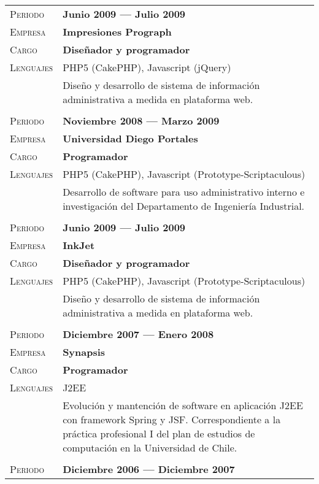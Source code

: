 \documentclass[letterpaper, oneside, final, 12pt]{scrartcl}
\newcommand{\gray}{\rowcolor[gray]{.90}}
\begin{document}
\begin{center}
\begin{tabularx}{0.97\linewidth}{>{\raggedleft\scshape}p{2.5cm}X}
\gray	Periodo		& \textbf{Junio 2009 --- Julio 2009} \\
\gray	Empresa		& \textbf{Impresiones Prograph} \\
\gray	Cargo		& \textbf{Dise\~nador y programador} \\
\gray	Lenguajes	& PHP5 (CakePHP), Javascript (jQuery)\\
					& Dise\~no y desarrollo de sistema de informaci\'on administrativa a medida en plataforma web. \\
					& \\
\gray	Periodo		& \textbf{Noviembre 2008 --- Marzo 2009} \\
\gray	Empresa		& \textbf{Universidad Diego Portales} \\
\gray	Cargo		& \textbf{Programador} \\
\gray	Lenguajes	& PHP5 (CakePHP), Javascript (Prototype-Scriptaculous) \\
					& Desarrollo de software para uso administrativo interno e investigaci\'on del Departamento de Ingenier\'ia Industrial. \\
					& \\
\gray	Periodo		& \textbf{Junio 2009 --- Julio 2009} \\
\gray	Empresa		& \textbf{InkJet} \\
\gray	Cargo		& \textbf{Dise\~nador y programador} \\
\gray	Lenguajes	& PHP5 (CakePHP), Javascript (Prototype-Scriptaculous)\\
					& Dise\~no y desarrollo de sistema de informaci\'on administrativa a medida en plataforma web. \\
					& \\
\gray	Periodo		& \textbf{Diciembre 2007 --- Enero 2008} \\
\gray	Empresa		& \textbf{Synapsis} \\
\gray	Cargo		& \textbf{Programador} \\
\gray	Lenguajes	& J2EE \\
					& Evoluci\'on y mantenci\'on de software en aplicaci\'on J2EE con framework Spring y JSF. Correspondiente a la pr\'actica profesional I del plan de estudios de computaci\'on en la Universidad de Chile. \\
					& \\
\gray	Periodo		& \textbf{Diciembre 2006 --- Diciembre 2007} \\

\end{tabularx}
\end{center}
\end{document}
